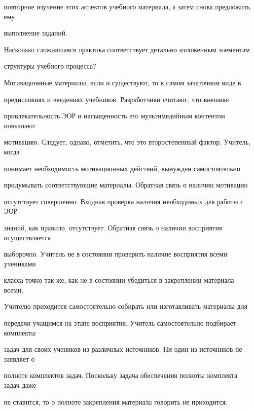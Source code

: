 повторное изучение этих аспектов учебного материала, а затем снова предложить ему 


выполнение заданий.





Насколько сложившаяся практика соответствует детально изложенным элементам 


структуры учебного процесса?





Мотивационные материалы, если и существуют, то в самом зачаточном виде в 


предисловиях и введениях учебников. Разработчики считают, что внешняя 


привлекательность ЭОР и насыщенность его мультимедийным контентом повышают 


мотивацию. Следует, однако, отметить, что это второстепенный фактор. Учитель, когда 


понимает необходимость мотивационных действий, вынужден самостоятельно 


придумывать соответствующие материалы. Обратная связь о наличии мотивации 


отсутствует совершенно. Входная проверка наличия необходимых для работы с ЭОР 


знаний, как правило, отсутствует. Обратная связь о наличии восприятия осуществляется 


выборочно. Учитель не в состоянии проверить наличие восприятия всеми учениками 


класса точно так же, как не в состоянии убедиться в закреплении материала всеми. 


Учителю приходится самостоятельно собирать или изготавливать материалы для 


передачи учащимся на этапе восприятия. Учитель самостоятельно подбирает комплекты 


задач для своих учеников из различных источников. Ни один из источников не заявляет о 


полноте комплектов задач. Поскольку задача обеспечения полноты комплекта задач даже 


не ставится, то о полноте закрепления материала говорить не приходится.


{





}





